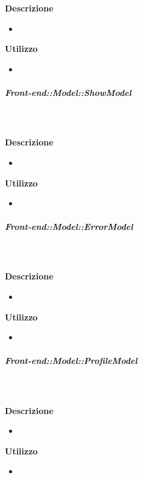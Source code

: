         \textbf{\\ \\ Descrizione} 
          \begin{itemize}
            \item[] 
          \end{itemize}      
        \textbf{Utilizzo}  
          \begin{itemize}
            \item[] 
          \end{itemize}
      \subparagraph{Front-end::Model::ShowModel}
        
        \textbf{\\ \\ Descrizione} 
          \begin{itemize}
            \item[] 
          \end{itemize}      
        \textbf{Utilizzo}  
          \begin{itemize}
            \item[] 
          \end{itemize}
      \subparagraph{Front-end::Model::ErrorModel}
        
        \textbf{\\ \\ Descrizione} 
          \begin{itemize}
            \item[] 
          \end{itemize}      
        \textbf{Utilizzo}  
          \begin{itemize}
            \item[] 
          \end{itemize}
      \subparagraph{Front-end::Model::ProfileModel}
        
        \textbf{\\ \\ Descrizione} 
          \begin{itemize}
            \item[] 
          \end{itemize}      
        \textbf{Utilizzo}  
          \begin{itemize}
            \item[] 
          \end{itemize}
